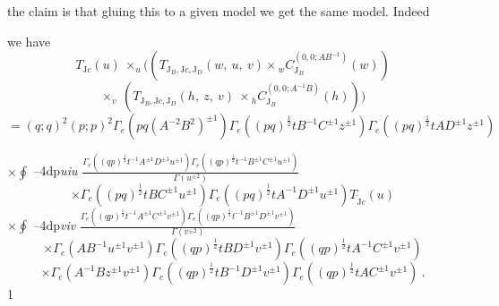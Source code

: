 \documentclass[a4paper,12pt]{article}
\begin{document}
the claim is that gluing this to a given model we get the same model. Indeed

we have
$$
T_{\mathrm{J}c}(u)\ \times_{u}((T_{\mathrm{J}_{B},\mathrm{J}c,\mathrm{J}_{D}}(w,\ u,\ v)\times {}_{w}C_{\mathrm{J}_{B}}^{(0,0;AB^{-1})}(w))
$$
$$
\times_{v}\ (T_{\mathrm{J}_{B},\mathrm{J}c,\mathrm{J}_{D}}(h,\ z,\ v)\ \times {}_{h}C_{\mathrm{J}_{B}}^{(0,0;A^{-1}B)}(h)))
$$
$=(q;q)^{2}(p;p)^{2}\Gamma_{e}(pq(A^{-2}B^{2})^{\pm 1})\Gamma_{e}((pq)^{\frac{1}{2}}tB^{-1}C^{\pm 1}z^{\pm 1})\Gamma_{e}((pq)^{\frac{1}{2}}tAD^{\pm 1}z^{\pm 1})$

$\displaystyle \times\oint$ --4dp{\it uiu} $\displaystyle \frac{\Gamma_{e}((qp)^{\frac{1}{2}}t^{-1}A^{\pm 1}D^{\pm 1}u^{\pm 1})\Gamma_{e}((qp)^{\frac{1}{2}}t^{-1}B^{\pm 1}C^{\pm 1}u^{\pm 1})}{\Gamma(u^{\pm 2})}$
$$
\times\Gamma_{e}((pq)^{\frac{1}{2}}tBC^{\pm 1}u^{\pm 1})\Gamma_{e}((pq)^{\frac{1}{2}}tA^{-1}D^{\pm 1}u^{\pm 1})T_{\tilde{\mathrm{J}}c}(u)
$$
$\displaystyle \times\oint$ --4dp{\it viv} $\displaystyle \frac{\Gamma_{e}((qp)^{\frac{1}{2}}t^{-1}A^{\pm 1}C^{\pm 1}v^{\pm 1})\Gamma_{e}((qp)^{\frac{1}{2}}t^{-1}B^{\pm 1}D^{\pm 1}v^{\pm 1})}{\Gamma(v^{\pm 2})}$
$$
\times\Gamma_{e}(AB^{-1}u^{\pm 1}v^{\pm 1})\Gamma_{e}((qp)^{\frac{1}{2}}tBD^{\pm 1}v^{\pm 1})\Gamma_{e}((qp)^{\frac{1}{2}}tA^{-1}C^{\pm 1}v^{\pm 1})
$$
$$
\times\Gamma_{e}(A^{-1}Bz^{\pm 1}v^{\pm 1})\Gamma_{e}((qp)^{\frac{1}{2}}tB^{-1}D^{\pm 1}v^{\pm 1})\Gamma_{e}((qp)^{\frac{1}{2}}tAC^{\pm 1}v^{\pm 1})\ .
$$
1
\end{document}
